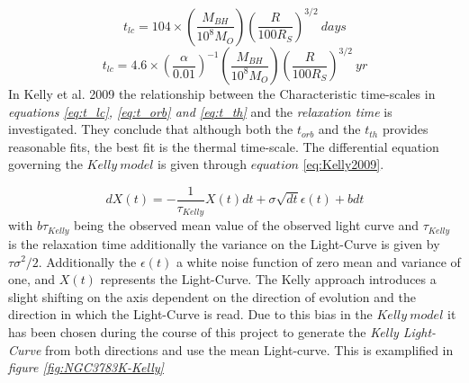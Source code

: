 \documentclass[a4paper, 12pt, twoside]{article}
\begin{document}
\begin{equation}
t_{lc} = 104\times(\frac{M_{BH}}{10^{8}M_{O}})(\frac{R}{100R_{S}})^{3/2}~days
\label{eq:t_orb}
\end{equation} 
\begin{equation}
t_{lc} = 4.6\times(\frac{\alpha}{0.01})^{-1}(\frac{M_{BH}}{10^{8}M_{O}})(\frac{R}{100R_{S}})^{3/2}~yr
\label{eq:t_th}
\end{equation} 
In Kelly et al. 2009 the relationship between the Characteristic time-scales in \emph{equations \ref{eq:t_lc}, \ref{eq:t_orb} and \ref{eq:t_th}} and the \emph{relaxation time} is investigated. They conclude that although both the $t_{orb}$ and the $t_{th}$ provides reasonable fits, the best fit is the thermal time-scale. The differential equation governing the $Kelly \ model$ is given through $equation$ \ref{eq:Kelly2009}.   




\begin{equation}
dX(t) = -\frac{1}{\tau_{Kelly}}X(t)dt + \sigma\sqrt{dt}\epsilon(t) + bdt
\label{eq:Kelly2009}
\end{equation}
with $b\tau_{Kelly}$ being the observed mean value of the observed light curve and $\tau_{Kelly}$ is the relaxation time additionally the variance on the Light-Curve is given by $\tau\sigma^{2}/2$. Additionally the $\epsilon(t)$ a white noise function of zero mean and variance of one, and $X(t)$ represents the Light-Curve. The Kelly approach introduces a slight shifting on the axis dependent on the direction of evolution and the direction in which the Light-Curve is read. Due to this bias in the $Kelly \ model$ it has been chosen during the course of this project to generate the \emph{Kelly Light-Curve} from both directions and use the mean Light-curve. This is examplified in \emph{figure \ref{fig:NGC3783K-Kelly}}
\end{document}
